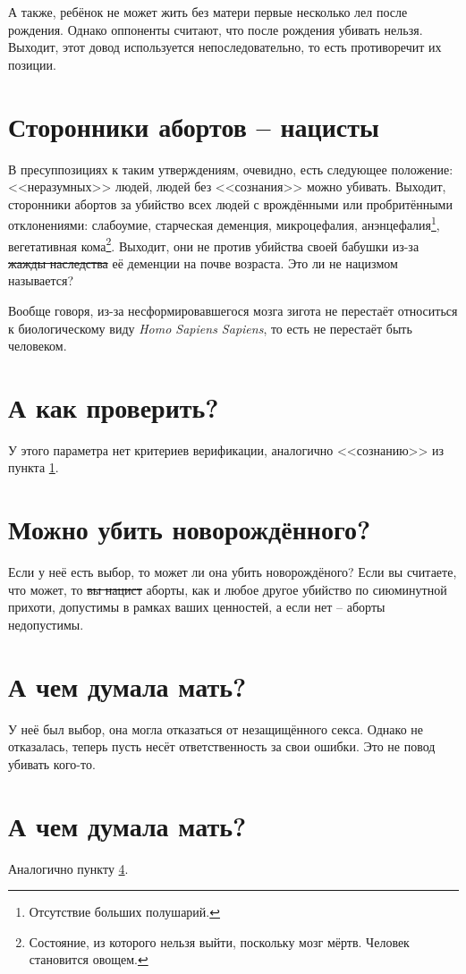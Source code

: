 \documentclass[a4paper,12pt]{report}
\begin{document}
        А также, ребёнок не может жить без матери первые несколько лел после рождения. Однако оппоненты считают, что после рождения убивать нельзя.
        Выходит, этот довод используется непоследовательно, то есть противоречит их позиции.
    \section{Сторонники абортов -- нацисты}\label{nazi}
        В пресуппозициях к таким утверждениям, очевидно, есть следующее положение: 
        <<неразумных>> людей, людей без <<сознания>> можно убивать. 
	    Выходит, сторонники абортов за убийство всех людей с врождёнными или 
        пробритёнными отклонениями: слабоумие, старческая деменция, микроцефалия, 
        анэнцефалия\footnote{Отсутствие больших полушарий.}, вегетативная 
        кома\footnote{Состояние, из которого нельзя выйти, поскольку мозг 
        мёртв. Человек становится овощем.}. 
        Выходит, они не против убийства своей бабушки из-за \sout{жажды наследства} 
        её деменции на почве возраста. Это ли не нацизмом называется?
        
        Вообще говоря, из-за несформировавшегося мозга зигота не перестаёт относиться к 
        биологическому виду \textit{Homo Sapiens Sapiens}, то есть не перестаёт быть человеком.
    \section{А как проверить?}
        У этого параметра нет критериев верификации, аналогично <<сознанию>> из пункта \ref{nazi}.
	\section{Можно убить новорождённого?}
        Если у неё есть выбор, то может ли она убить новорождёного? 
        Если вы считаете, что может, то \sout{вы нацист} аборты, как и любое другое 
        убийство по сиюминутной прихоти, допустимы в рамках ваших ценностей, а 
        если нет -- аборты недопустимы.
    \section{А чем думала мать?}\label{thing-about-it}
        У неё был выбор, она могла отказаться от незащищённого секса. Однако не отказалась, 
        теперь пусть несёт ответственность за свои ошибки. Это не повод убивать кого-то.
	\section{А чем думала мать?}
        Аналогично пункту \ref{thing-about-it}.
\end{document}
